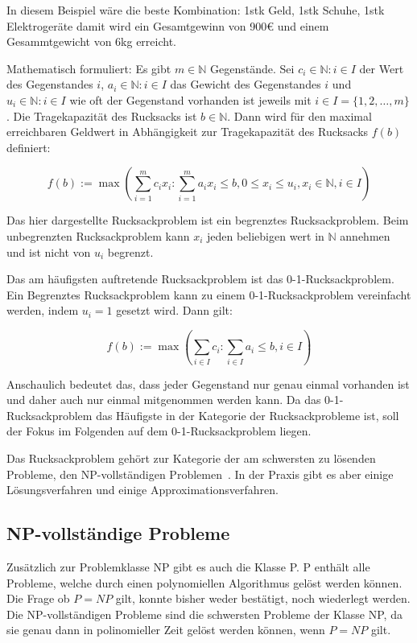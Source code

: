 \documentclass[12pt, a4paper, ngerman]{article}
\newcommand{\natnums}{\ensuremath{\mathbb{N}}}
\begin{document}
In diesem Beispiel wäre die beste Kombination: 1stk Geld, 1stk Schuhe, 1stk Elektrogeräte
damit wird ein Gesamtgewinn von 900€ und einem Gesammtgewicht von 6kg erreicht.

Mathematisch formuliert: Es gibt \(m\in\natnums\) Gegenstände.
Sei \(c_i\in\natnums : i\in I\) der Wert des Gegenstandes \(i\),
\(a_i\in\natnums : i\in I\) das Gewicht des Gegenstandes \(i\)
und \(u_i\in \natnums : i\in I\) wie oft der Gegenstand vorhanden ist jeweils mit \(i\in I = \{1 ,2 ,\ldots ,m\} \).
Die Tragekapazität des Rucksacks ist \(b\in\natnums\).
Dann wird für den maximal erreichbaren Geldwert in Abhängigkeit zur Tragekapazität des Rucksacks \(f(b)\) definiert:

\[
  f(b):=\max(\sum_{i=1}^m c_i x_i : \sum_{i=1}^m a_i x_i\leq b, 0\leq x_i\leq u_i,  x_i\in\natnums, i\in I)
\]

Das hier dargestellte Rucksackproblem ist ein begrenztes Rucksackproblem.
Beim unbegrenzten Rucksackproblem kann \(x_i\) jeden beliebigen wert in \(\natnums \) annehmen und ist nicht von \(u_i\) begrenzt.

Das am häufigsten auftretende Rucksackproblem ist das 0-1-Rucksackproblem.
Ein Begrenztes Rucksackproblem kann zu einem 0-1-Rucksackproblem vereinfacht werden, indem \(u_i=1\) gesetzt wird. Dann gilt:

\[
  f(b):=\max(\sum_{i\in I}c_i : \sum_{i\in I}a_i\leq b, i\in I)
\]

Anschaulich bedeutet das, dass jeder Gegenstand nur genau einmal vorhanden ist
und daher auch nur einmal mitgenommen werden kann. Da das 0-1-Rucksackproblem das Häufigste in der Kategorie der Rucksackprobleme ist, soll der Fokus im Folgenden auf dem 0-1-Rucksackproblem liegen. %

Das Rucksackproblem gehört zur Kategorie der am schwersten zu lösenden Probleme,
den NP-vollständigen Problemen~\cite{mainKnapsack}.
In der Praxis gibt es aber einige Lösungsverfahren und einige Approximationsverfahren.

\subsection{NP-vollständige Probleme}
Zusätzlich zur Problemklasse NP gibt es auch die Klasse P. P enthält alle Probleme, welche durch einen polynomiellen Algorithmus gelöst werden können. Die Frage ob \(P = NP\) gilt, konnte bisher weder bestätigt, noch wiederlegt werden. Die NP-vollständigen Probleme sind die schwersten Probleme der Klasse NP, da sie genau dann in polinomieller Zeit gelöst werden können, wenn \(P = NP\) gilt.
\cite[Kap. 15]{KombinatorischeOptimierung}
\end{document}
